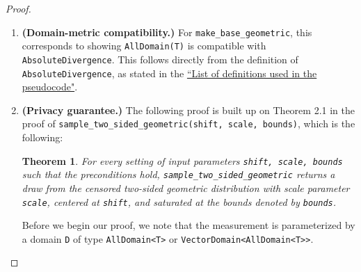 \documentclass[11pt,a4paper]{article}
\newtheorem{theorem}{Theorem}[section]
\newtheorem{lemma}[theorem]{Lemma}
\newcommand{\vicki}[1]{{ {\color{olive}{(vicki)~#1}}}}
\newcommand{\hanwen}[1]{{ {\color{purple}{(hanwen)~#1}}}}
\begin{document}
\begin{proof}
\begin{enumerate}
    \item \textbf{(Domain-metric compatibility.)} For \texttt{make\_base\_geometric}, this corresponds to showing \texttt{AllDomain(T)} is compatible with \texttt{AbsoluteDivergence}. This follows directly from the definition of \texttt{AbsoluteDivergence}, as stated in the \href{https://github.com/opendp/whitepapers/blob/pseudocode-defns/pseudocode-defns/pseudocode_defns.pdf}{``List of definitions used in the pseudocode"}.
    \item \textbf{(Privacy guarantee.)} 
    The following proof is built up on Theorem 2.1 in the proof
    of \texttt{sample\_two\_sided\_geometric(shift, scale, bounds)}, which is the following: \hanwen{link to be put here}
    
    \begin{tcolorbox}
    \begin{theorem}
     For every setting of input parameters \texttt{shift, scale, bounds} such that the preconditions hold, \texttt{sample\_two\_sided\_geometric} returns a draw from the censored two-sided geometric distribution with scale parameter \texttt{scale}, centered at \texttt{shift}, and saturated at the bounds denoted by \texttt{bounds}. 
    \end{theorem}

    \end{tcolorbox}
    Before we begin our proof, we note that the measurement is parameterized by a domain \texttt{D} of type \texttt{AllDomain<T>} or \texttt{VectorDomain<AllDomain<T>>}.
    

\end{enumerate}
\end{proof}
\end{document}
